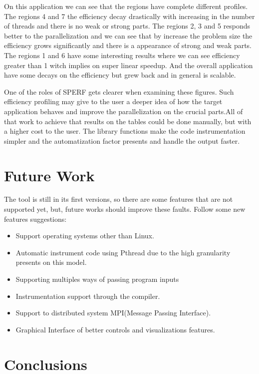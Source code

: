 \documentclass[sigconf]{acmart}
\begin{document}
On this application we can see that the regions have complete different profiles. The regions 4 and 7 the efficiency decay drastically with increasing in the number of threads and there is no weak or strong parts. The regions 2, 3 and 5 responds better to the parallelization and we can see that by increase the problem size the efficiency grows significantly and there is a appearance of strong and weak parts. The regions 1 and 6 have some interesting results where we can see efficiency greater than 1 witch implies on super linear speedup. And the overall application have some decays on the efficiency but grew back and in general is scalable.

One of the roles of SPERF gets clearer when examining these figures. Such efficiency profiling may give to the user a deeper idea of how the target application behaves and improve the parallelization on the crucial parts.All of that work to achieve that results on the tables could be done manually, but with a higher cost to the user. The library functions make the code instrumentation simpler and the automatization factor presents and handle the output faster.

\section{Future Work}
\label{sec:future_work}

The tool is still in its first versions, so there are some features that are not supported yet, but, future works should improve these faults. Follow some new features suggestions:
\begin{itemize}
\item Support operating systems other than Linux. 
\item Automatic instrument code using Pthread due to the high granularity presents on this model.
\item Supporting multiples ways of passing program inputs
\item Instrumentation support through the compiler.
\item Support to distributed system MPI(Message Passing Interface).
\item Graphical Interface of better controls and visualizations features.
\end{itemize}


\section{Conclusions}
\label{sec:conclusions}
\end{document}
